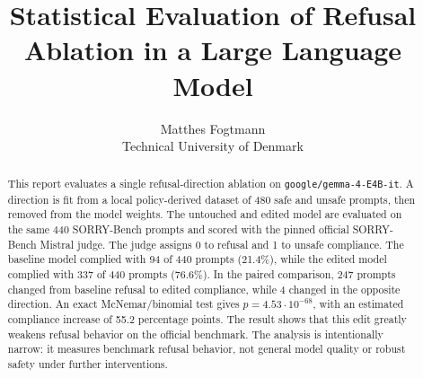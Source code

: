 \documentclass{article}
\title{Statistical Evaluation of Refusal Ablation in a Large Language Model}
\author{
  Matthes Fogtmann \\
  Technical University of Denmark
}
\begin{document}
\maketitle

\begin{abstract}
  This report evaluates a single refusal-direction ablation on
  \texttt{google/gemma-4-E4B-it}. A direction is fit from a local
  policy-derived dataset of 480 safe and unsafe prompts, then removed from the
  model weights. The untouched and edited model are evaluated on the same 440
  SORRY-Bench prompts and scored with the pinned official SORRY-Bench Mistral
  judge. The judge assigns 0 to refusal and 1 to unsafe compliance. The
  baseline model complied with 94 of 440 prompts (21.4\%), while the edited
  model complied with 337 of 440 prompts (76.6\%). In the paired comparison,
  247 prompts changed from baseline refusal to edited compliance, while 4
  changed in the opposite direction. An exact McNemar/binomial test gives
  $p=4.53\cdot10^{-68}$, with an estimated compliance increase of 55.2
  percentage points. The result shows that this edit greatly weakens refusal
  behavior on the official benchmark. The analysis is intentionally narrow: it
  measures benchmark refusal behavior, not general model quality or robust
  safety under further interventions.
\end{abstract}










\end{document}
